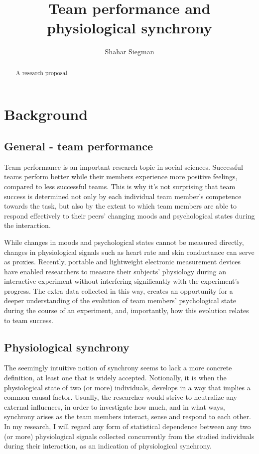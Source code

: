 \documentclass[a4paper, 11pt]{article}      %
\title{\LARGE \bf
Team performance and physiological synchrony
}
\author{Shahar Siegman}
\begin{document}
\maketitle
\thispagestyle{empty}
\pagestyle{empty}


\begin{abstract}

A research proposal.

\end{abstract}

\section{Background}
\subsection{General - team performance}
Team performance is an important research topic in social sciences. Successful teams perform better while their members experience more positive feelings, compared to less successful teams. This is why it's not surprising that team success is determined not only by each individual team member's competence towards the task, but also by the extent to which team members are able to respond effectively to their peers' changing moods and psychological states during the interaction.

While changes in moods and psychological states cannot be measured directly, changes in physiological signals such as heart rate and skin conductance can serve as proxies. Recently, portable and lightweight electronic measurement devices have enabled researchers to measure their subjects' physiology during an interactive experiment without interfering significantly with the experiment's progress. The extra data collected in this way, creates an opportunity for a deeper understanding of the evolution of team members' psychological state during the course of an experiment, and, importantly, how this evolution relates to team success.


\subsection{Physiological synchrony}
The seemingly intuitive notion of synchrony seems to lack a more concrete definition, at least one that is widely accepted. Notionally, it is when the physiological state of two (or more) individuals, develops in a way that implies a common causal factor. Usually, the researcher would strive to neutralize any external influences, in order to investigate how much, and in what ways, synchrony arises as the team members interact, sense and respond to each other. In my research, I will regard any form of statistical dependence between any two (or more) physiological signals collected concurrently from the studied individuals during their interaction, as an indication of physiological synchrony.
\end{document}
